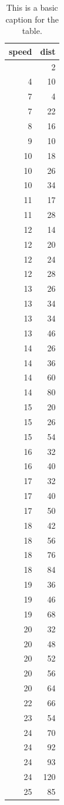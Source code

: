 \documentclass[
  letterpaper,
  DIV=11,
  numbers=noendperiod]{scrartcl}
\begin{document}
\begin{longtable}{rr}

\caption{\label{tbl-format-gt}This is a basic caption for the table.}

\tabularnewline

\toprule
{\bfseries speed} & {\bfseries dist} \\ 
\midrule\endhead\addlinespace[2.5pt]
4 & 2 \\ 
4 & 10 \\ 
7 & 4 \\ 
7 & 22 \\ 
8 & 16 \\ 
9 & 10 \\ 
10 & 18 \\ 
10 & 26 \\ 
10 & 34 \\ 
11 & 17 \\ 
11 & 28 \\ 
12 & 14 \\ 
12 & 20 \\ 
12 & 24 \\ 
12 & 28 \\ 
13 & 26 \\ 
13 & 34 \\ 
13 & 34 \\ 
13 & 46 \\ 
14 & 26 \\ 
14 & 36 \\ 
14 & 60 \\ 
14 & 80 \\ 
15 & 20 \\ 
15 & 26 \\ 
15 & 54 \\ 
16 & 32 \\ 
16 & 40 \\ 
17 & 32 \\ 
17 & 40 \\ 
17 & 50 \\ 
18 & 42 \\ 
18 & 56 \\ 
18 & 76 \\ 
18 & 84 \\ 
19 & 36 \\ 
19 & 46 \\ 
19 & 68 \\ 
20 & 32 \\ 
20 & 48 \\ 
20 & 52 \\ 
20 & 56 \\ 
20 & 64 \\ 
22 & 66 \\ 
23 & 54 \\ 
24 & 70 \\ 
24 & 92 \\ 
24 & 93 \\ 
24 & 120 \\ 
25 & 85 \\ 
\bottomrule

\end{longtable}
\end{document}
